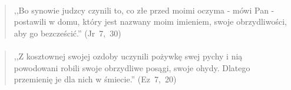 \documentclass[10pt,a4paper,oneside]{article}
\begin{document}
\paragraph{}
\begin{quote}
,,Bo synowie judzcy czynili to, co złe przed moimi oczyma - mówi Pan - postawili w domu, który jest nazwany moim imieniem, swoje obrzydliwości, aby go bezcześcić.'' \mbox{(Jr 7, 30)}
\end{quote}
\paragraph{}
\begin{quote}
,,Z kosztownej swojej ozdoby uczynili pożywkę swej pychy i nią powodowani robili swoje obrzydliwe posągi, swoje ohydy. Dlatego przemienię je dla nich w śmiecie.'' \mbox{(Ez 7, 20)}
\end{quote}
\end{document}
